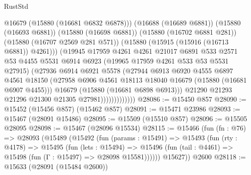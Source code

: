 \begin{lexlean}{RustStd}
\begin{coremodule}
                              @16679
                              (@15880 (@16681 @6832 @6878)))
                            (@16688 (@16689 @6881))
                            (@15880 (@16693 @6881))
                            (@15880 (@16698 @6881))
                            (@15880 (@16702 @6881 @281))
                            (@15880 (@16707 @2569 @281 @571))
                            (@15880 (@15915 (@15916 (@16713 @6881)) @4261)))
                          (@19945
                            @17959
                            @4261
                            @4261
                            @21017
                            @6891
                            @533
                            @2571
                            @53
                            @4455
                            @5531
                            @6914
                            @6923
                            (@19965 @17959 @4261 @533 @53 @5531 @27915)
                            (@27936
                              @6914
                              @6921
                              @5578
                              (@27944
                                @6913
                                @6920
                                @4555
                                @6897
                                @4561
                                @18150
                                (@27958
                                  @6906
                                  @4561
                                  @18113
                                  @18040
                                  @16679
                                  (@15880 (@16681 @6907 @4455)))
                                @16679
                                (@15880 (@16681 @6898 @6913)))
                              @21290
                              @21293
                              @21296
                              @21300
                              @21305
                              @27981)))))))))))))
@28086 := @15450 @857
@28090 := @15452 (@15456 @857) (@15462 @857)
@28091 := @15471 @23986
@28093 := @15467 (@28091 @15486)
@28095 := @15509 (@15510 @857)
@28096 := @15505 @28095
@28098 := @15467 (@28096 @15534)
@28115 := @15466
    (fun (fn : @76) =>
    @28093
      (@15489
        (@15492
          (fun (params : @15491) =>
          @15493
            (fun (rty : @4178) =>
            @15495
              (fun (lets : @15494) =>
              @15496 (fun (tail : @4461) => @15498 (fun (Γ : @15497) => @28098 @15581))))))
        @15627))
    @2600
@28118 := @15633 (@28091 (@15484 @2600))

\end{coremodule}
\end{lexlean}
